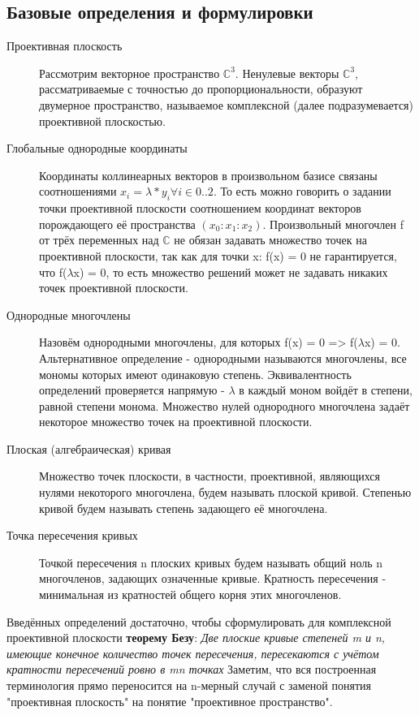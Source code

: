 \documentclass[a4paper, 12pt]{article}
\begin{document}
\subsection{Базовые определения и формулировки}
\begin{description}
\item[Проективная плоскость]
Рассмотрим векторное пространство $\mathbb{C}^3$. Ненулевые векторы $\mathbb{C}^3$, рассматриваемые с точностью до пропорциональности, образуют двумерное пространство, называемое комплексной (далее подразумевается) проективной плоскостью.
\item[Глобальные однородные координаты]
Координаты коллинеарных векторов в произвольном базисе связаны соотношениями $x_i=\lambda*y_i  \forall i \in {0..2}$. То есть можно говорить о задании точки проективной плоскости соотношением координат векторов порождающего её пространства $(x_0:x_1:x_2)$.
Произвольный многочлен f от трёх переменных над $\mathbb{C}$ не обязан задавать множество точек на проективной плоскости, так как для точки x: f(x) = 0 не гарантируется, что f($\lambda$x) = 0, то есть множество решений может не задавать никаких точек проективной плоскости.
\item[Однородные многочлены] Назовём однородными многочлены, для которых f(x) = 0 => f($\lambda$x) = 0. Альтернативное определение - однородными называются многочлены, все мономы которых имеют одинаковую степень. Эквивалентность определений проверяется напрямую - $\lambda$ в каждый моном войдёт в степени, равной степени монома. Множество нулей однородного многочлена задаёт некоторое множество точек на проективной плоскости.
\item[Плоская (алгебраическая) кривая]
Множество точек плоскости, в частности, проективной, являющихся нулями некоторого многочлена, будем называть плоской кривой. Степенью кривой будем называть степень задающего её многочлена.
\item[Точка пересечения кривых]
Точкой пересечения n плоских кривых будем называть общий ноль n многочленов, задающих означенные кривые. Кратность пересечения - минимальная из кратностей общего корня этих многочленов.
\end{description}
Введённых определений достаточно, чтобы сформулировать для комплексной проективной плоскости \textbf{теорему Безу}:
\textit{Две плоские кривые степеней m и n, имеющие конечное количество точек пересечения, пересекаются с учётом кратности пересечений ровно в mn точках}
Заметим, что вся построенная терминология прямо переносится на n-мерный случай с заменой понятия "проективная плоскость" на понятие "проективное пространство".
\end{document}
